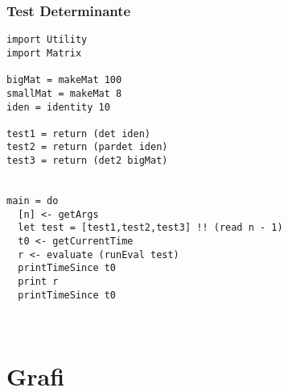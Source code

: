 \subsubsection{Test Determinante}
\begin{verbatim}
import Utility
import Matrix

bigMat = makeMat 100
smallMat = makeMat 8
iden = identity 10

test1 = return (det iden)
test2 = return (pardet iden)
test3 = return (det2 bigMat)


main = do
  [n] <- getArgs
  let test = [test1,test2,test3] !! (read n - 1)
  t0 <- getCurrentTime
  r <- evaluate (runEval test)
  printTimeSince t0
  print r
  printTimeSince t0
        
        
\end{verbatim}
\section{Grafi}
